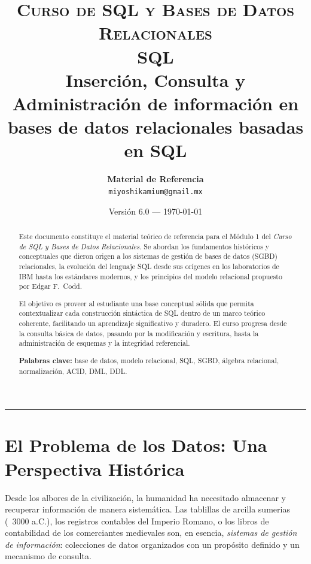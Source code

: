 \documentclass[12pt, a4paper]{article}
\title{%
	{\large \textsc{Curso de SQL y Bases de Datos Relacionales}}\\[6pt]
	{\LARGE \textbf{SQL}}\\[4pt]
	{\large Inserción, Consulta y Administración de información en bases de datos relacionales basadas en SQL}
}
\author{%
	\textbf{Material de Referencia }\\[2pt]
	\small \texttt{miyoshikamium@gmail.mx}
}
\date{\small Versión 6.0 — \today}
\begin{document}
	
	\maketitle
	\thispagestyle{fancy}
	
	\begin{abstract}
		\noindent
		Este documento constituye el material teórico de referencia para el
		Módulo 1 del \textit{Curso de SQL y Bases de Datos Relacionales}.
		Se abordan los fundamentos históricos y conceptuales que dieron origen
		a los sistemas de gestión de bases de datos (SGBD) relacionales, la
		evolución del lenguaje SQL desde sus orígenes en los laboratorios de
		IBM hasta los estándares modernos, y los principios del modelo
		relacional propuesto por Edgar F.\ Codd.
		
		El objetivo es proveer al estudiante una base conceptual sólida que
		permita contextualizar cada construcción sintáctica de SQL dentro de
		un marco teórico coherente, facilitando un aprendizaje significativo
		y duradero. El curso progresa desde la consulta básica de datos,
		pasando por la modificación y escritura, hasta la administración
		de esquemas y la integridad referencial.
		
		\smallskip
		\textbf{Palabras clave:} base de datos, modelo relacional, SQL, SGBD,
		álgebra relacional, normalización, ACID, DML, DDL.
	\end{abstract}
	
	\tableofcontents
	\vspace{8pt}
	\hrule
	\vspace{10pt}
	
	
	\section{El Problema de los Datos: Una Perspectiva Histórica}
	
	Desde los albores de la civilización, la humanidad ha necesitado
	almacenar y recuperar información de manera sistemática.
	Las tablillas de arcilla sumerias (~3000 a.C.), los registros
	contables del Imperio Romano, o los libros de contabilidad de los
	comerciantes medievales son, en esencia, \textit{sistemas de gestión
		de información}: colecciones de datos organizados con un propósito
	definido y un mecanismo de consulta.
	
\end{document}
